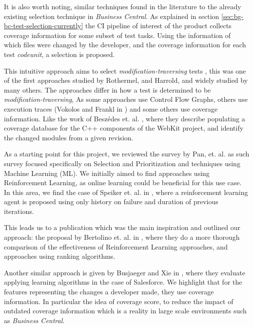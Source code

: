 It is also worth noting, similar techniques found in the literature to the already 
existing selection technique in \emph{Business Central}. As explained in section \ref{sec:bg-bc-test-selection-currently}
the CI pipeline of interest of the product collects coverage information for some subset of test tasks.
Using the information of which files were changed by the developer, and the coverage information
for each test \emph{codeunit}, a selection is proposed. 

This intuitive approach aims to select \emph{modification-traversing} tests \cite{536955}, 
this was one of the first approaches studied by Rothermel, and Harrold, and widely studied by many others.
The approaches differ in how a test is determined to be \emph{modification-traversing}, 
As some approaches use Control Flow Graphs\cite{366926}, others use execution traces (Vokolos and Frankl in \cite{Vokolos1997PythiaAR})
and some others use coverage information. Like the work of Beszédes et. al. \cite{Beszdes2012CodeCR}, where they
describe populating a coverage database for the C++ components of the WebKit project,
and identify the changed modules from a given revision.

As a starting point for this project, we reviewed the survey by Pan, et. al. \cite{Pan2021TestCS} as 
such survey focused specifically on Selection and Prioritization and techniques using 
Machine Learning (ML). We initially aimed to find approaches using Reinforcement Learning,
as online learning could be beneficial for this use case. In this area, we find the case of
Speiker et. al. in \cite{DBLP:journals/corr/abs-1811-04122}, where a reinforcement learning agent is proposed using only
history on failure and duration of previous iterations.

This leads us to a publication which was the main inspiration and outlined our approach:
the proposal by Bertolino et. al. in \cite{Bertolino2020LearningtoRankVR}, where they do a
more thorough comparison of the effectiveness of Reinforcement Learning approaches, and
approaches using ranking algorithms.

Another similar approach is given by Busjaeger and Xie in \cite{Busjaeger2016LearningFT}, where they evaluate 
applying learning algorithms in the case of Salesforce. We highlight that for the features representing
the changes a developer made, they use coverage information. In particular the idea of coverage score, to 
reduce the impact of outdated coverage information which is a reality in large scale environments such
as \emph{Business Central}.

